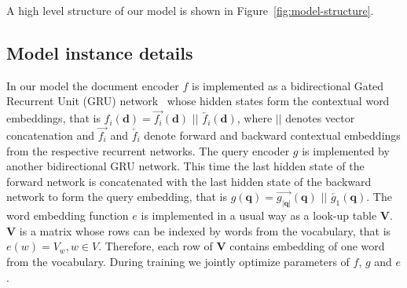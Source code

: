 \documentclass[11pt]{article}
\newcommand{\fwd}[1]{\overrightarrow{#1}}
\newcommand{\back}[1]{\overleftarrow{#1}}
\newcommand{\ctxTransducer}{f}
\newcommand{\queryEncoder}{g}
\newcommand{\embed}{e}
\newcommand{\querySeq}{\mathbf{q}}
\newcommand{\documentSeq}{\mathbf{d}}
\newcommand{\vocabMat}{\mathbf{V}}
\begin{document}
A high level structure of our model is shown in Figure~\ref{fig:model-structure}.


\subsection{Model instance details}
In our model the document encoder $\ctxTransducer$ is implemented as a bidirectional Gated Recurrent Unit (GRU) network~\cite{Cho2014,Chung2014} whose hidden states form the contextual word embeddings, that is $\ctxTransducer_i(\documentSeq) = \fwd{\ctxTransducer_i}(\documentSeq) \,\, ||\,\, \back{\ctxTransducer_i}(\documentSeq)$, where $||$ denotes vector concatenation and $\fwd{\ctxTransducer_i}$ and $\back{\ctxTransducer_i}$ denote forward and backward contextual embeddings from the respective recurrent networks.
The query encoder $\queryEncoder$ is implemented by another bidirectional GRU network. This time the last hidden state of the forward network is concatenated with the last hidden state of the backward network to form the query embedding, that is $\queryEncoder(\querySeq) = \fwd{\queryEncoder_{|\querySeq|}}(\querySeq)\,\, ||\,\, \back{\queryEncoder_1}(\querySeq)$.
The word embedding function $e$ is implemented in a usual way as a look-up table $\vocabMat$. $\vocabMat$ is a matrix whose rows can be indexed by words from the vocabulary, that is $e(w) = V_w , w \in V$. Therefore, each row of $\vocabMat$ contains embedding of one word from the vocabulary.  During training we jointly optimize parameters of $\ctxTransducer$, $\queryEncoder$ and $e$.

\end{document}
